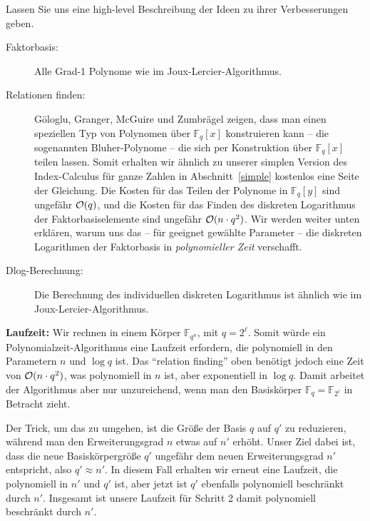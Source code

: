 \begin{refsegment}
Lassen Sie uns eine high-level Beschreibung der Ideen zu ihrer Verbesserungen geben.

\begin{description}
\item[Faktorbasis:] Alle Grad-1 Polynome wie im Joux-Lercier-Algorithmus.

\item[Relationen finden:] G\"ologlu, Granger, McGuire und Zumbr\"agel zeigen, dass man einen speziellen Typ von Polynomen über $\mathbb{F}_q[x]$ konstruieren kann -- die sogenannten Bluher-Polynome -- die sich per Konstruktion über $\mathbb{F}_q[x]$ teilen lassen. Somit erhalten wir ähnlich zu unserer simplen Version des Index-Calculus für ganze Zahlen in Abschnitt~\ref{simple} kostenlos eine Seite der Gleichung. Die Kosten für das Teilen der Polynome in $\mathbb{F}_q[y]$ sind ungefähr ${\cal O}(q)$, und die Kosten für das Finden des diskreten Logarithmus der Faktorbasiselemente sind ungefähr ${\cal O}(n \cdot q^2)$. Wir werden weiter unten erklären, warum uns das -- für geeignet gewählte Parameter -- die diskreten Logarithmen der Faktorbasis in {\em polynomieller Zeit} verschafft.

\item[Dlog-Berechnung:] Die Berechnung des individuellen diskreten Logarithmus ist ähnlich wie im Joux-Lercier-Algorithmus.
\end{description}

\textbf{Laufzeit:} Wir rechnen in einem Körper $\mathbb{F}_{q^n}$, mit $q=2^{\ell}$. Somit würde ein Polynomialzeit-Algorithmus eine Laufzeit erfordern, die polynomiell in den Parametern $n$ und $\log q$ ist. Das "`relation finding"' oben benötigt jedoch eine Zeit von ${\cal O}(n \cdot q^2)$, was polynomiell in $n$ ist, aber exponentiell in $\log q$. Damit arbeitet der Algorithmus aber nur unzureichend, wenn man den Basiskörper $\mathbb{F}_q = \mathbb{F}_{2^{\ell}}$ in Betracht zieht.

Der Trick, um das zu umgehen, ist die Größe der Basis $q$ auf $q'$ zu reduzieren, während man den Erweiterungsgrad $n$ etwas auf $n'$ erhöht. Unser Ziel dabei ist, dass die neue Basiskörpergröße $q'$ ungefähr dem neuen Erweiterungsgrad $n'$ entspricht, also $q' \approx n'$. In diesem Fall erhalten wir erneut eine Laufzeit, die polynomiell in $n'$ und $q'$ ist, aber jetzt ist $q'$ ebenfalls polynomiell beschränkt durch $n'$. Insgesamt ist unsere Laufzeit für Schritt 2 damit polynomiell beschränkt durch $n'$.\\[0.1cm]


\end{refsegment}
